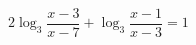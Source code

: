 \begin{ex}[type=equation]
	\begin{condition}
		$2\log_3 \dfrac{x - 3}{x - 7} + \log_3 \dfrac{x - 1}{x - 3} = 1$
	\end{condition}
\end{ex}